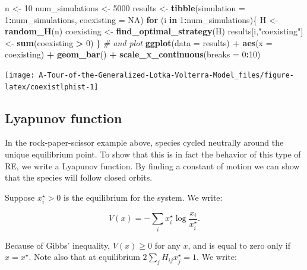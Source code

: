 \documentclass[]{book}
\newenvironment{Shaded}{\begin{snugshade}}{\end{snugshade}}
\newcommand{\CommentTok}[1]{\textcolor[rgb]{0.56,0.35,0.01}{\textit{#1}}}
\newcommand{\ControlFlowTok}[1]{\textcolor[rgb]{0.13,0.29,0.53}{\textbf{#1}}}
\newcommand{\DataTypeTok}[1]{\textcolor[rgb]{0.13,0.29,0.53}{#1}}
\newcommand{\DecValTok}[1]{\textcolor[rgb]{0.00,0.00,0.81}{#1}}
\newcommand{\KeywordTok}[1]{\textcolor[rgb]{0.13,0.29,0.53}{\textbf{#1}}}
\newcommand{\NormalTok}[1]{#1}
\newcommand{\OperatorTok}[1]{\textcolor[rgb]{0.81,0.36,0.00}{\textbf{#1}}}
\newcommand{\OtherTok}[1]{\textcolor[rgb]{0.56,0.35,0.01}{#1}}
\newcommand{\StringTok}[1]{\textcolor[rgb]{0.31,0.60,0.02}{#1}}
\begin{document}
\begin{Shaded}
\begin{Highlighting}[]
\NormalTok{n <-}\StringTok{ }\DecValTok{10}
\NormalTok{num_simulations <-}\StringTok{ }\DecValTok{5000}
\NormalTok{results <-}\StringTok{ }\KeywordTok{tibble}\NormalTok{(}\DataTypeTok{simulation =} \DecValTok{1}\OperatorTok{:}\NormalTok{num_simulations, }\DataTypeTok{coexisting =} \OtherTok{NA}\NormalTok{)}
\ControlFlowTok{for}\NormalTok{ (i }\ControlFlowTok{in} \DecValTok{1}\OperatorTok{:}\NormalTok{num_simulations)\{}
\NormalTok{  H <-}\StringTok{ }\KeywordTok{random_H}\NormalTok{(n)}
\NormalTok{  coexisting <-}\StringTok{ }\KeywordTok{find_optimal_strategy}\NormalTok{(H)}
\NormalTok{  results[i,}\StringTok{"coexisting"}\NormalTok{] <-}\StringTok{ }\KeywordTok{sum}\NormalTok{(coexisting }\OperatorTok{>}\StringTok{ }\DecValTok{0}\NormalTok{)}
\NormalTok{\}}
\CommentTok{# and plot}
\KeywordTok{ggplot}\NormalTok{(}\DataTypeTok{data =}\NormalTok{ results) }\OperatorTok{+}\StringTok{ }
\StringTok{  }\KeywordTok{aes}\NormalTok{(}\DataTypeTok{x =}\NormalTok{ coexisting) }\OperatorTok{+}\StringTok{ }
\StringTok{  }\KeywordTok{geom_bar}\NormalTok{() }\OperatorTok{+}\StringTok{ }
\StringTok{  }\KeywordTok{scale_x_continuous}\NormalTok{(}\DataTypeTok{breaks =} \DecValTok{0}\OperatorTok{:}\DecValTok{10}\NormalTok{)}
\end{Highlighting}
\end{Shaded}

\begin{center}\texttt{[image: A-Tour-of-the-Generalized-Lotka-Volterra-Model\_files/figure-latex/coexistlphist-1]} \end{center}

\hypertarget{lyapunov-function}{%
\subsection{Lyapunov function}\label{lyapunov-function}}

In the rock-paper-scissor example above, species cycled neutrally around the unique equilibrium point. To show that this is in fact the behavior of this type of RE, we write a Lyapunov function. By finding a constant of motion we can show that the species will follow closed orbits.

Suppose \(x_{i}^\star > 0\) is the equilibrium for the system. We write:

\[
V(x) = -\sum_i x_i^\star \log \frac{x_i}{x_i^\star} .
\]

Because of Gibbs' inequality, \(V(x) \geq 0\) for any \(x\), and is equal to zero only if \(x = x^\star\). Note also that at equilibrium \(2 \sum_j H_{ij} x_j^\star = 1\). We write:
\end{document}
